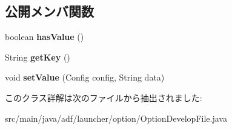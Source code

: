 \subsection*{公開メンバ関数}
\begin{DoxyCompactItemize}
\item 
\hypertarget{classadf_1_1launcher_1_1option_1_1OptionDevelopFile_ae802912681e9c05daebda71b6dee7e8b}{}\label{classadf_1_1launcher_1_1option_1_1OptionDevelopFile_ae802912681e9c05daebda71b6dee7e8b} 
boolean {\bfseries has\+Value} ()
\item 
\hypertarget{classadf_1_1launcher_1_1option_1_1OptionDevelopFile_acf37257ebe0d55127a0edd2ccbc6adde}{}\label{classadf_1_1launcher_1_1option_1_1OptionDevelopFile_acf37257ebe0d55127a0edd2ccbc6adde} 
String {\bfseries get\+Key} ()
\item 
\hypertarget{classadf_1_1launcher_1_1option_1_1OptionDevelopFile_a4fa7ba5359a4501a905485262b1762ea}{}\label{classadf_1_1launcher_1_1option_1_1OptionDevelopFile_a4fa7ba5359a4501a905485262b1762ea} 
void {\bfseries set\+Value} (Config config, String data)
\end{DoxyCompactItemize}


このクラス詳解は次のファイルから抽出されました\+:\begin{DoxyCompactItemize}
\item 
src/main/java/adf/launcher/option/Option\+Develop\+File.\+java\end{DoxyCompactItemize}
